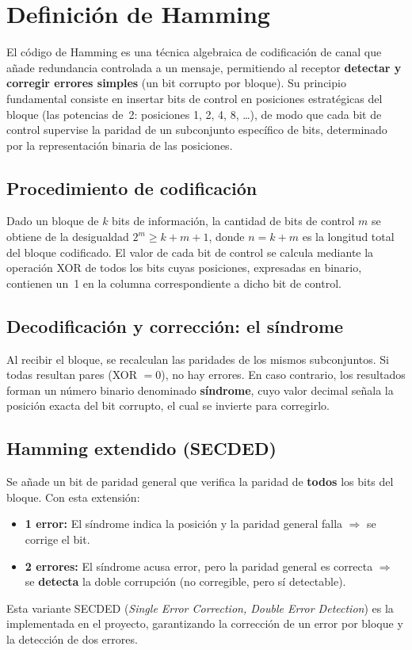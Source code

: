 \chapter*{Definición de Hamming}


El código de Hamming es una técnica algebraica de codificación de canal que añade redundancia controlada a un mensaje, permitiendo al receptor \textbf{detectar y corregir errores simples} (un bit corrupto por bloque). Su principio fundamental consiste en insertar bits de control en posiciones estratégicas del bloque (las potencias de~2: posiciones 1, 2, 4, 8, \ldots), de modo que cada bit de control supervise la paridad de un subconjunto específico de bits, determinado por la representación binaria de las posiciones.

\section*{Procedimiento de codificación}


Dado un bloque de $k$ bits de información, la cantidad de bits de control $m$ se obtiene de la desigualdad $2^m \ge k + m + 1$, donde $n = k + m$ es la longitud total del bloque codificado. El valor de cada bit de control se calcula mediante la operación XOR de todos los bits cuyas posiciones, expresadas en binario, contienen un~1 en la columna correspondiente a dicho bit de control.

\section*{Decodificación y corrección: el síndrome}


Al recibir el bloque, se recalculan las paridades de los mismos subconjuntos. Si todas resultan pares (XOR $= 0$), no hay errores. En caso contrario, los resultados forman un número binario denominado \textbf{síndrome}, cuyo valor decimal señala la posición exacta del bit corrupto, el cual se invierte para corregirlo.

\section*{Hamming extendido (SECDED)}


Se añade un bit de paridad general que verifica la paridad de \textbf{todos} los bits del bloque. Con esta extensión:
\begin{itemize}
    \item \textbf{1 error:} El síndrome indica la posición y la paridad general falla $\Rightarrow$ se corrige el bit.
    \item \textbf{2 errores:} El síndrome acusa error, pero la paridad general es correcta $\Rightarrow$ se \textbf{detecta} la doble corrupción (no corregible, pero sí detectable).
\end{itemize}


Esta variante SECDED (\textit{Single Error Correction, Double Error Detection}) es la implementada en el proyecto, garantizando la corrección de un error por bloque y la detección de dos errores.
